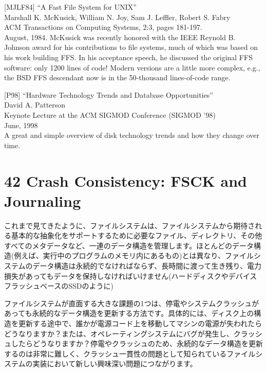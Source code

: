 {[}MJLF84{]} ``A Fast File System for UNIX''\\
Marshall K. McKusick, William N. Joy, Sam J. Leffler, Robert S. Fabry\\
ACM Transactions on Computing Systems, 2:3, pages 181-197.\\
August, 1984. McKusick was recently honored with the IEEE Reynold B.
Johnson award for his contributions to file systems, much of which was
based on his work building FFS. In his acceptance speech, he discussed
the original FFS software: only 1200 lines of code! Modern versions are
a little more complex, e.g., the BSD FFS descendant now is in the
50-thousand lines-of-code range.

{[}P98{]} ``Hardware Technology Trends and Database Opportunities''\\
David A. Patterson\\
Keynote Lecture at the ACM SIGMOD Conference (SIGMOD '98)\\
June, 1998\\
A great and simple overview of disk technology trends and how they
change over time.

\newpage

\hypertarget{crash-consistency-fsck-and-journaling}{%
\section*{42 Crash Consistency: FSCK and
Journaling}\label{crash-consistency-fsck-and-journaling}}

これまで見てきたように、ファイルシステムは、ファイルシステムから期待される基本的な抽象化をサポートするために必要なファイル、ディレクトリ、その他すべてのメタデータなど、一連のデータ構造を管理します。ほとんどのデータ構造(例えば、実行中のプログラムのメモリ内にあるもの)とは異なり、ファイルシステムのデータ構造は永続的でなければならず、長時間に渡って生き残り、電力損失があってもデータを保持しなければいけません(ハードディスクやデバイスフラッシュベースのSSDのように)

ファイルシステムが直面する大きな課題の1つは、停電やシステムクラッシュがあっても永続的なデータ構造を更新する方法です。具体的には、ディスク上の構造を更新する途中で、誰かが電源コード上を移動してマシンの電源が失われたらどうなりますか？または、オペレーティングシステムにバグが発生し、クラッシュしたらどうなりますか？停電やクラッシュのため、永続的なデータ構造を更新するのは非常に難しく、クラッシュ一貫性の問題として知られているファイルシステムの実装において新しい興味深い問題につながります。

